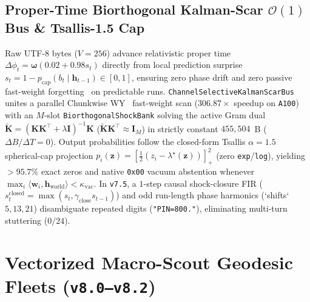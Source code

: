 \documentclass[10pt,twocolumn]{article}
\begin{document}
\subsection{Proper-Time Biorthogonal Kalman-Scar $\mathcal{O}(1)$ Bus \& Tsallis-1.5 Cap}
Raw UTF-8 bytes ($V=256$) advance relativistic proper time $\Delta\phi_t = \boldsymbol{\omega}(0.02 + 0.98 s_t)$ directly from local prediction surprise $s_t = 1 - p_{\text{cap}}(b_t \mid \mathbf{h}_{t-1}) \in [0,1]$, ensuring zero phase drift and zero passive fast-weight forgetting~\citep{widrow1960adaptive,schmidhuber1992learning,schlag2021linear} on predictable runs. \texttt{ChannelSelectiveKalmanScarBus} unites a parallel Chunkwise WY~\citep{bischof1987wy,yang2024parallelizing} fast-weight scan ($\mathbf{306.87\times}$ speedup on \texttt{A100}) with an $M$-slot \texttt{BiorthogonalShockBank} solving the active Gram dual $\widetilde{\mathbf{K}} = (\mathbf{K}\mathbf{K}^\top + \lambda\mathbf{I})^{-1}\mathbf{K}$ ($\widetilde{\mathbf{K}}\mathbf{K}^\top \approx \mathbf{I}_M$) in strictly constant $455{,}504$~B ($\Delta B/\Delta T = 0$). Output probabilities follow the closed-form Tsallis $\alpha=1.5$~\citep{tsallis1988possible,peters2019sparse} spherical-cap projection $p_i(\mathbf{z}) = [\frac{1}{2}(z_i - \lambda^\star(\mathbf{z}))]_+^2$ (zero \texttt{exp}/\texttt{log}), yielding $>95.7\%$ exact zeros and native \texttt{0x00} vacuum abstention whenever $\max_i \langle \mathbf{w}_i, \mathbf{h}_{\text{world}}\rangle < \kappa_{\text{vac}}$. In \texttt{v7.5}, a $1$-step causal shock-closure FIR ($s_t^{\text{closed}} = \max(s_t, \gamma_{\text{close}} s_{t-1})$) and odd run-length phase harmonics (`shifts` $5, 13, 21$) disambiguate repeated digits (\texttt{"PIN=800."}), eliminating multi-turn stuttering ($0/24$).

\section{Vectorized Macro-Scout Geodesic Fleets (\texttt{v8.0--v8.2})}
\end{document}
